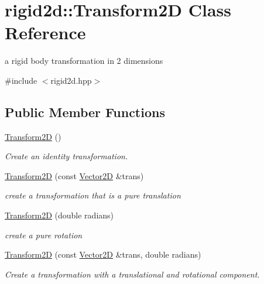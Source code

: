 \hypertarget{classrigid2d_1_1Transform2D}{}\section{rigid2d\+:\+:Transform2D Class Reference}
\label{classrigid2d_1_1Transform2D}


a rigid body transformation in 2 dimensions  




{\ttfamily \#include $<$rigid2d.\+hpp$>$}

\subsection*{Public Member Functions}
\begin{DoxyCompactItemize}
\item 
\mbox{\label{classrigid2d_1_1Transform2D_a455fbd07f86d3aeaaeca954a0904397a}} 
\hyperlink{classrigid2d_1_1Transform2D_a455fbd07f86d3aeaaeca954a0904397a}{Transform2D} ()
\begin{DoxyCompactList}\small\item\em Create an identity transformation. \end{DoxyCompactList}\item 
\hyperlink{classrigid2d_1_1Transform2D_ab3e595da2315ed50ba8eb24ead0c8d78}{Transform2D} (const \hyperlink{structrigid2d_1_1Vector2D}{Vector2D} \&trans)
\begin{DoxyCompactList}\small\item\em create a transformation that is a pure translation \end{DoxyCompactList}\item 
\hyperlink{classrigid2d_1_1Transform2D_a3f2f654cb039320e331931c0877b39a3}{Transform2D} (double radians)
\begin{DoxyCompactList}\small\item\em create a pure rotation \end{DoxyCompactList}\item 
\hyperlink{classrigid2d_1_1Transform2D_a47de6c24f25c57da553a0fdaf13e2138}{Transform2D} (const \hyperlink{structrigid2d_1_1Vector2D}{Vector2D} \&trans, double radians)
\begin{DoxyCompactList}\small\item\em Create a transformation with a translational and rotational component. \end{DoxyCompactList}\item 

\end{DoxyCompactItemize}
